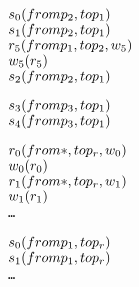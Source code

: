 \newsavebox{\boxTOne}
\begin{lrbox}{\boxTOne}
\begin{minipage}[t]{0.6\linewidth}
\large
\begin{alltt}
\(s\sb{0}(from p\sb{2}, to p\sb{1})\)
\(s\sb{1}(from p\sb{2}, to p\sb{1})\)
\(r\sb{5}(from p\sb{1}, to p\sb{2}, w\sb{5})\)
\(w\sb{5}(r\sb{5})\)
\(s\sb{2}(from p\sb{2}, to p\sb{1})\)
\end{alltt}
\end{minipage}
\end{lrbox}

\newsavebox{\boxTTwo}
\begin{lrbox}{\boxTTwo}
\begin{minipage}[t]{0.6\linewidth}
\large
\begin{alltt}
\(s\sb{3}(from p\sb{3}, to p\sb{1})\)
\(s\sb{4}(from p\sb{3}, to p\sb{1})\)
\end{alltt}
\end{minipage}
\end{lrbox}


\newcommand\examplefigone{
\begin{figure*}[tb]
\begin{center}
\setlength{\tabcolsep}{2pt}
\begin{tabular}[t]{c|c|c}
$\mathit{p_1}$ & $\mathit{p_2}$ & $\mathit{p_3}$ \\
\hline
\scalebox{0.8}{\usebox{\boxTZero}}&
\scalebox{0.8}{\usebox{\boxTOne}} &
\scalebox{0.8}{\usebox{\boxTTwo}}
\end{tabular}
\end{center}
\caption{A simple concurrent trace program.}
\label{fig:example}
\end{figure*}
}

\newsavebox{\TemplateboxTZero}
\begin{lrbox}{\TemplateboxTZero}
\begin{minipage}[t]{0.4\linewidth}
\large
\begin{alltt}
\(r\sb{0}(from \ast, to p\sb{r}, w\sb{0})\)
\(w\sb{0}(r\sb{0})\)
\(r\sb{1}(from \ast, to p\sb{r}, w\sb{1})\)
\(w\sb{1}(r\sb{1})\)
\ldots
\end{alltt}
\end{minipage}
\end{lrbox}

\newsavebox{\TemplateboxTOne}
\begin{lrbox}{\TemplateboxTOne}
\begin{minipage}[t]{0.35\linewidth}
\large
\begin{alltt}
\(s\sb{0}(from p\sb{1}, to p\sb{r})\)
\(s\sb{1}(from p\sb{1}, to p\sb{r})\)
\ldots
\end{alltt}
\end{minipage}
\end{lrbox}

